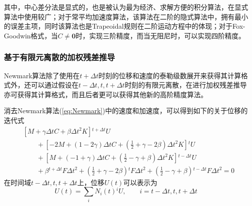 其中，中心差分法是显式的，也是被认为最为经济、求解方便的积分算法，在显式算法中使用较广；对于常平均加速度算法，该算法在二阶的隐式算法中，拥有最小的误差主项\cite{Dahlquist1963}，同时该算法也是Trapeoidal规则在二阶运动方程中的体现；对于Fox-Goodwin格式，当$C\neq\mathbf{0}$时，实现三阶精度，而当无阻尼时，可以实现四阶精度。

\subsubsection{基于有限元离散的加权残差推导}
Newmark算法除了使用在$t+\Delta t$时刻的位移和速度的泰勒级数展开来获得其计算格式外，还可以通过假设在$t-\Delta t,t,t+\Delta t$时刻的有限元离散，在进行加权残差推导亦可获得其计算格式\cite{Zienkiewicz1977a}，而且后者更可以获得其他新的高阶精度算法。

消去Newmark算法(\ref{eq:Newmark})中的速度和加速度，可以得到如下的关于位移的迭代式
\begin{equation}
\begin{aligned}
&[M+\gamma\Delta tC+\beta\Delta t^2K]{^{t+\Delta t}\!U}\\
&\qquad+[-2M+(1-2\gamma)\Delta tC+(\frac{1}{2}+\gamma-2\beta)\Delta t^2K]{^t\!U}\\
&\qquad+[M+(-1+\gamma)\Delta tC+(\frac12-\gamma+\beta)\Delta t^2K]{^{t-\Delta t}\!U}\\
&\qquad+\beta{^{t+\Delta t}\!F}\Delta t^2+(\frac{1}{2}+\gamma-2\beta){^t\!F}\Delta t^2+(\frac{1}{2}-\gamma+\beta){^{t-\Delta t}\!F}\Delta t^2=0
\end{aligned}\label{eq:NewmarkDisF}
\end{equation}
在时间域$t-\Delta t,t,t+\Delta t$上，位移$U(t)$可以表示为
\begin{equation}
U(t)=\sum_{i}N_i(t){^i\!U},\qquad i=t-\Delta t,t,t+\Delta t
\end{equation}

